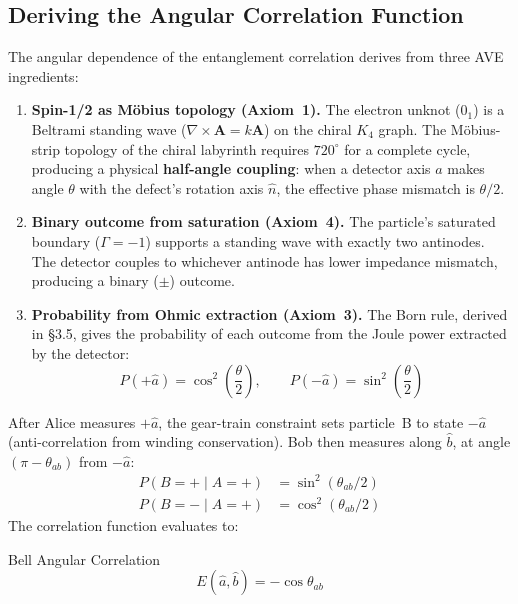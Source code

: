 \subsection{Deriving the Angular Correlation Function}
\label{subsec:bell_correlation}
The angular dependence of the entanglement correlation derives from three AVE ingredients:

\begin{enumerate}
    \item \textbf{Spin-1/2 as M\"obius topology (Axiom~1).} The electron unknot ($0_1$) is a Beltrami standing wave ($\nabla \times \mathbf{A} = k\mathbf{A}$) on the chiral $K_4$ graph. The M\"obius-strip topology of the chiral labyrinth requires $720^\circ$ for a complete cycle, producing a physical \textbf{half-angle coupling}: when a detector axis $\hat{a}$ makes angle $\theta$ with the defect's rotation axis $\hat{n}$, the effective phase mismatch is $\theta/2$.

    \item \textbf{Binary outcome from saturation (Axiom~4).} The particle's saturated boundary ($\Gamma = -1$\gammaundeclared{}) supports a standing wave with exactly two antinodes. The detector couples to whichever antinode has lower impedance mismatch, producing a binary ($\pm$) outcome.

    \item \textbf{Probability from Ohmic extraction (Axiom~3).} The Born rule, derived in \S3.5, gives the probability of each outcome from the Joule power extracted by the detector:
    \begin{equation}
        P(+\hat{a}) = \cos^2\!\left(\frac{\theta}{2}\right), \qquad P(-\hat{a}) = \sin^2\!\left(\frac{\theta}{2}\right)
    \end{equation}
\end{enumerate}

\noindent After Alice measures $+\hat{a}$, the gear-train constraint sets particle~B to state $-\hat{a}$ (anti-correlation from winding conservation). Bob then measures along $\hat{b}$, at angle $(\pi - \theta_{ab})$ from $-\hat{a}$:
\begin{align}
    P(B{=}+ \mid A{=}+) &= \sin^2(\theta_{ab}/2) \\
    P(B{=}- \mid A{=}+) &= \cos^2(\theta_{ab}/2)
\end{align}
The correlation function evaluates to:
\begin{resultbox}{Bell Angular Correlation}
\begin{equation}
    E(\hat{a}, \hat{b}) = -\cos\theta_{ab}
\end{equation}
\end{resultbox}

